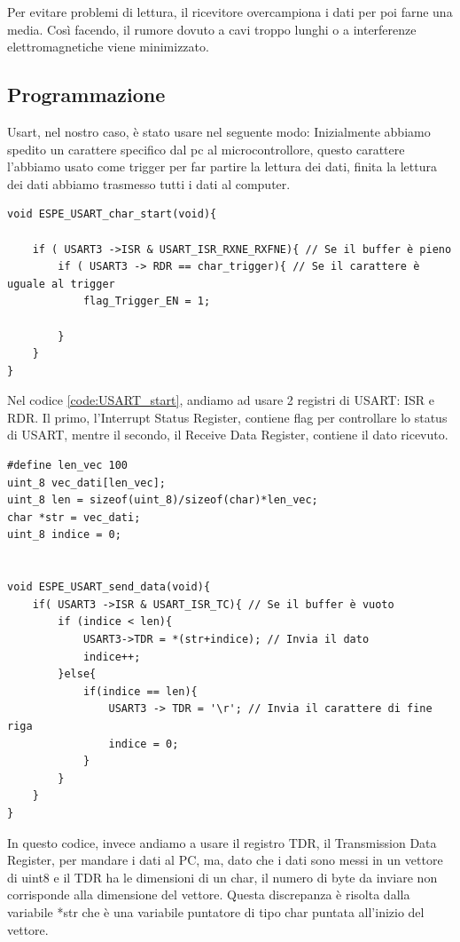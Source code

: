 Per evitare problemi di lettura, il ricevitore overcampiona i dati per poi farne una media. Così facendo, il rumore dovuto a cavi troppo lunghi o a interferenze elettromagnetiche viene minimizzato.\\


\subsection{Programmazione}
Usart, nel nostro caso, è stato usare nel seguente modo: Inizialmente abbiamo spedito un carattere specifico dal pc al microcontrollore, questo carattere l'abbiamo usato come trigger per far partire la lettura dei dati, finita la lettura dei dati abbiamo trasmesso tutti i dati al computer.\\

\noindent
\begin{verbatim}
void ESPE_USART_char_start(void){

    if ( USART3 ->ISR & USART_ISR_RXNE_RXFNE){ // Se il buffer è pieno
        if ( USART3 -> RDR == char_trigger){ // Se il carattere è uguale al trigger
            flag_Trigger_EN = 1;

        }
    }
}
\end{verbatim}
\label{code:USART_start}

Nel codice {\hypersetup{linkcolor=black}\ref{code:USART_start}}, andiamo ad usare 2 registri di USART: ISR e RDR. Il primo, l'Interrupt Status Register, contiene flag per controllare lo status di USART, mentre il secondo, il Receive Data Register, contiene il dato ricevuto.\\

\noindent
\begin{verbatim}
#define len_vec 100
uint_8 vec_dati[len_vec];
uint_8 len = sizeof(uint_8)/sizeof(char)*len_vec;
char *str = vec_dati;
uint_8 indice = 0;


void ESPE_USART_send_data(void){
    if( USART3 ->ISR & USART_ISR_TC){ // Se il buffer è vuoto
		if (indice < len){
			USART3->TDR = *(str+indice); // Invia il dato
			indice++;
		}else{
			if(indice == len){
				USART3 -> TDR = '\r'; // Invia il carattere di fine riga
				indice = 0;
			}
		}
	}
}
\end{verbatim}
\label{code:USART_send}

In questo codice, invece andiamo a usare il registro TDR, il Transmission Data Register, per mandare i dati al PC, ma, dato che i dati sono messi in un vettore di uint8 e il TDR ha le dimensioni di un char, il numero di byte da inviare non corrisponde alla dimensione del vettore. Questa discrepanza è risolta dalla variabile *str che è una variabile puntatore di tipo char puntata all'inizio del vettore.\\


